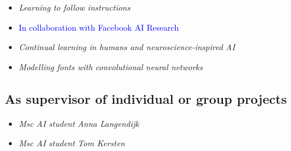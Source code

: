{{{{{{{{{
{\begin{itemize}
  \item[] \textit{Learning to follow instructions}
  \item[] \textcolor{blue}{\normalfont In collaboration with Facebook AI Research\vspace{1mm}}
\end{itemize}}}

{
{\begin{itemize}
  \item[] \textit{Continual learning in humans and neuroscience-inspired AI}
\end{itemize}}}

{
{\begin{itemize}
  \item[] \textit{Modelling fonts with convolutional neural networks}
\end{itemize}}}

\vspace{1mm}

\subsection{As supervisor of individual or group projects}

{
{\begin{itemize}
  \item[] \textit{Msc AI student Anna Langendijk}
\end{itemize}}}

{
{\begin{itemize}
  \item[] \textit{Msc AI student Tom Kersten}
\end{itemize}}}


}}}}}}}}
